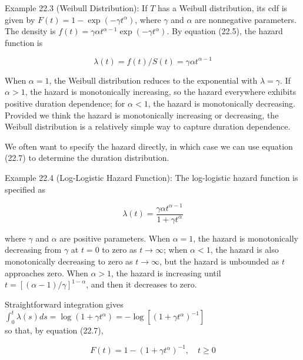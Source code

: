 \documentclass[10pt]{article}
\begin{document}
Example 22.3 (Weibull Distribution): If $T$ has a Weibull distribution, its cdf is given by $F(t)=1-\exp \left(-\gamma t^{\alpha}\right)$, where $\gamma$ and $\alpha$ are nonnegative parameters. The density is $f(t)=\gamma \alpha t^{\alpha-1} \exp \left(-\gamma t^{\alpha}\right)$. By equation (22.5), the hazard function is


\begin{equation*}
\lambda(t)=f(t) / S(t)=\gamma \alpha t^{\alpha-1} \tag{22.12}
\end{equation*}


When $\alpha=1$, the Weibull distribution reduces to the exponential with $\lambda=\gamma$. If $\alpha>1$, the hazard is monotonically increasing, so the hazard everywhere exhibits positive duration dependence; for $\alpha<1$, the hazard is monotonically decreasing. Provided we think the hazard is monotonically increasing or decreasing, the Weibull distribution is a relatively simple way to capture duration dependence.

We often want to specify the hazard directly, in which case we can use equation (22.7) to determine the duration distribution.

Example 22.4 (Log-Logistic Hazard Function): The log-logistic hazard function is specified as


\begin{equation*}
\lambda(t)=\frac{\gamma \alpha t^{\alpha-1}}{1+\gamma t^{\alpha}} \tag{22.13}
\end{equation*}


where $\gamma$ and $\alpha$ are positive parameters. When $\alpha=1$, the hazard is monotonically decreasing from $\gamma$ at $t=0$ to zero as $t \rightarrow \infty$; when $\alpha<1$, the hazard is also monotonically decreasing to zero as $t \rightarrow \infty$, but the hazard is unbounded as $t$ approaches zero. When $\alpha>1$, the hazard is increasing until $t=[(\alpha-1) / \gamma]^{1-\alpha}$, and then it decreases to zero.

Straightforward integration gives\\
$\int_{0}^{t} \lambda(s) d s=\log \left(1+\gamma t^{\alpha}\right)=-\log \left[\left(1+\gamma t^{\alpha}\right)^{-1}\right]$\\
so that, by equation (22.7),


\begin{equation*}
F(t)=1-\left(1+\gamma t^{\alpha}\right)^{-1}, \quad t \geq 0 \tag{22.14}
\end{equation*}
\end{document}
